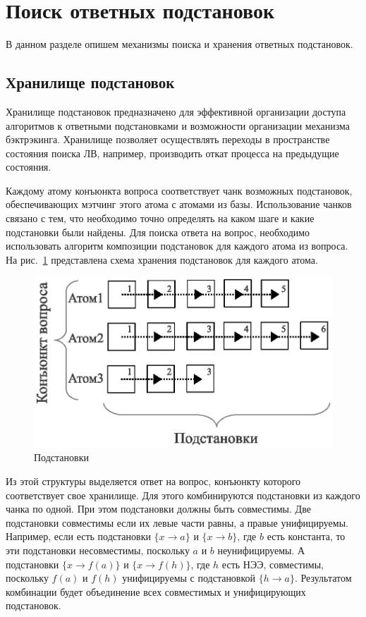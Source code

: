 \section{Поиск ответных подстановок}
В данном разделе опишем механизмы поиска и хранения ответных подстановок.


\subsection{Хранилище подстановок}
Хранилище подстановок предназначено для эффективной организации доступа алгоритмов к ответными подстановками и возможности организации механизма бэктрэкинга. Хранилище позволяет осуществлять переходы в пространстве состояния поиска ЛВ, например, производить откат процесса на предыдущие состояния.

Каждому атому конъюнкта вопроса соответствует чанк возможных подстановок, обеспечивающих мэтчинг этого атома с атомами из базы. Использование чанков связано с тем, что необходимо точно определять на каком шаге и какие подстановки были найдены. Для поиска ответа на вопрос, необходимо использовать алгоритм композиции подстановок для каждого атома из вопроса. На рис.~\ref{fig:anbase} представлена схема хранения подстановок для каждого атома.
\begin{figure}[h]
  \centering
  \includegraphics[width=0.7\linewidth]{pics/AnBase.eps}
  \caption{Подстановки}
  \label{fig:anbase}
\end{figure}

Из этой структуры выделяется ответ на вопрос, конъюнкту которого соответствует свое хранилище. Для этого комбинируются подстановки из каждого чанка по одной. При этом подстановки должны быть совместимы. Две подстановки совместимы если их левые части равны, а правые унифицируемы. Например, если есть подстановки $\{x \rightarrow a\}$ и $\{x \rightarrow b\}$, где $b$ есть константа, то эти подстановки несовместимы, поскольку $a$ и $b$ неунифицируемы. А подстановки $\{x \rightarrow f(a)\}$ и $\{x \rightarrow f(h)\}$, где $h$ есть НЭЭ, совместимы, поскольку $f(a)$ и $f(h)$ унифицируемы с подстановкой $\{h \rightarrow a\}$. Результатом комбинации будет объединение всех совместимых и унифицирующих подстановок.

